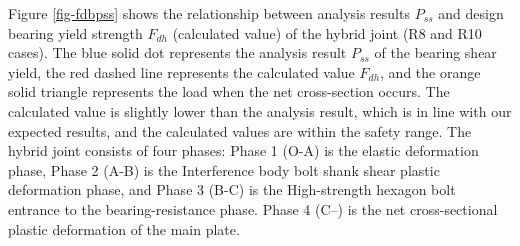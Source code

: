 Figure \ref{fig-fdbpss} shows the relationship between analysis results $P_{ss}$ and design bearing yield strength $F_{dh}$ (calculated value) of the hybrid joint (R8 and R10 cases). The blue solid dot represents the analysis result $P_{ss}$ of the bearing shear yield, the red dashed line represents the calculated value $F_{dh}$, and the orange solid triangle represents the load when the net cross-section occurs. The calculated value is slightly lower than the analysis result, which is in line with our expected results, and the calculated values are within the safety range. The hybrid joint consists of four phases: Phase 1 (O-A) is the elastic deformation phase, Phase 2 (A-B) is the Interference body bolt shank shear plastic deformation phase, and Phase 3 (B-C) is the High-strength hexagon bolt entrance to the bearing-resistance phase. Phase 4 (C–) is the net cross-sectional plastic deformation of the main plate. 

